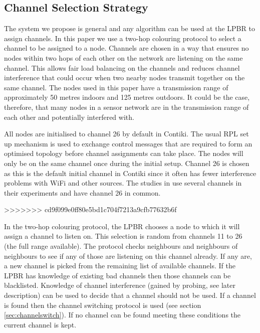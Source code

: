\subsection{Channel Selection Strategy}

The system we propose is general and any algorithm can be used at the LPBR to assign channels. In this paper we use a two-hop colouring protocol to select a channel to be assigned to a node. Channels are chosen in a way that
ensures no nodes within two hops of each other on the network are listening on the same channel.
This allows fair load balancing on the channels and reduces channel interference that could occur when two nearby nodes transmit together on the same channel. The nodes used in this paper have a transmission range of approximately 50 metres indoors and 125 metres outdoors. It could be the case, therefore, that many nodes in a sensor network are in the transmission range of each other and potentially interfered with.

All nodes are initialised to channel 26 by default in Contiki.
The usual RPL set up mechanism is used to exchange control messages that are required to form an optimised topology before channel assignments can take place. The nodes will only be on the same channel once during the initial setup. Channel 26 is chosen as this is the default initial channel in Contiki since it often has fewer interference problems with WiFi and other sources. The studies in \cite{chrysso, micmac, watteyne} use several channels in their experiments and have channel 26 in common.
	
>>>>>>> cd9f099e0ff80e5bd1c704f7213a9cfb77632b6f

In the two-hop colouring protocol, the LPBR chooses a node to which it will assign a channel to listen on.  
This selection is random from channels 11 to 26 (the full range available). The protocol checks neighbours and neighbours of neighbours to see if any of those are listening on this channel already. If any are, a new channel is picked from the remaining list of available channels. If the LPBR has knowledge of existing bad channels then those channels can be blacklisted.  Knowledge of channel interference (gained by probing, see later description) can be used to decide that a channel should not be used. If a channel is found then the channel switching protocol is used (see section \ref{sec:channelswitch}). If no channel can be found meeting these conditions the current
channel is kept.  

